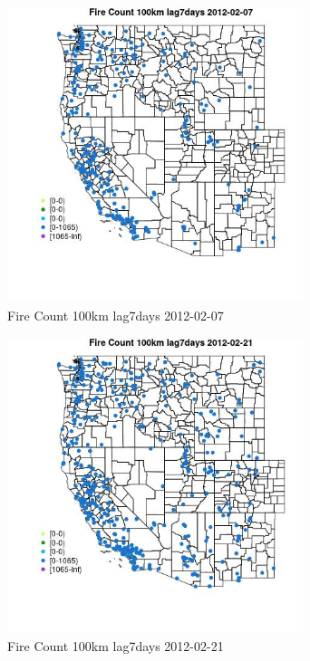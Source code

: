 \begin{figure} 
\centering  
\includegraphics[width=0.77\textwidth]{Code_Outputs/Report_ML_input_PM25_Step4_part_f_de_duplicated_aves_prioritize_24hr_obswNAs_MapObsFire_Count_100km_lag7days2012-02-07.jpg} 
\caption{\label{fig:Report_ML_input_PM25_Step4_part_f_de_duplicated_aves_prioritize_24hr_obswNAsMapObsFire_Count_100km_lag7days2012-02-07}Fire Count 100km lag7days 2012-02-07} 
\end{figure} 
 

\begin{figure} 
\centering  
\includegraphics[width=0.77\textwidth]{Code_Outputs/Report_ML_input_PM25_Step4_part_f_de_duplicated_aves_prioritize_24hr_obswNAs_MapObsFire_Count_100km_lag7days2012-02-21.jpg} 
\caption{\label{fig:Report_ML_input_PM25_Step4_part_f_de_duplicated_aves_prioritize_24hr_obswNAsMapObsFire_Count_100km_lag7days2012-02-21}Fire Count 100km lag7days 2012-02-21} 
\end{figure} 
 

